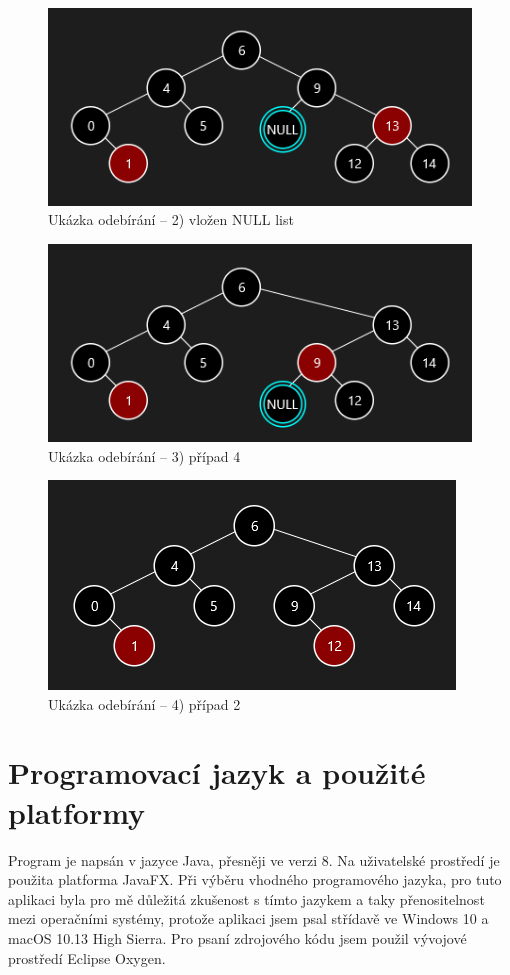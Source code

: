 \documentclass[
  biblatex=false,
  font=serif,
  glossaries=false,
  tables=false,
  theorems=false,
  index
]{kidiplom}
\begin{document}
\begin{figure}[h!]
\centering
	\includegraphics[scale=0.8]{obrazky/31CCMazani.png}
	\caption{Ukázka odebírání -- 2) vložen NULL list}
\end{figure}

\begin{figure}[h!]
\centering
	\includegraphics[scale=0.8]{obrazky/32CCMazani.png}
	\caption{Ukázka odebírání -- 3) případ 4}
\end{figure}

\begin{figure}[h!]
\centering
	\includegraphics[scale=0.8]{obrazky/33CCMazani.png}
	\caption{Ukázka odebírání -- 4) případ 2}
\end{figure}

\newpage
\section{Programovací jazyk a použité platformy}
\indent\indent Program je napsán v jazyce Java, přesněji ve verzi 8. Na uživatelské prostředí je použita platforma JavaFX. Při výběru vhodného programového jazyka, pro tuto aplikaci byla pro mě důležitá zkušenost s tímto jazykem a taky přenositelnost mezi operačními systémy, protože aplikaci jsem psal střídavě ve Windows 10 a macOS 10.13 High Sierra. Pro psaní zdrojového kódu jsem použil vývojové prostředí Eclipse Oxygen.
\end{document}
